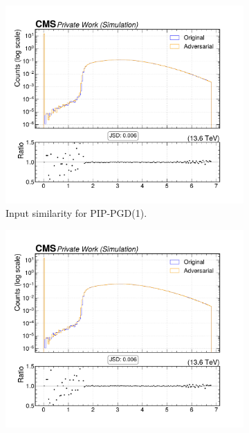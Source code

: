 \begin{figure}[htbp]
  \centering
  \begin{subfigure}[t]{0.32\textwidth}
    \includegraphics[width=\linewidth]{media/output/features/compare/combined_it_1/cmp_cpf_arr_Cpfcan_BtagPf_trackEtaRel.pdf}
    \caption*{Input similarity for PIP-PGD(1).}
  \end{subfigure}\hfill
  \begin{subfigure}[t]{0.32\textwidth}
    \includegraphics[width=\linewidth]{media/output/features/compare/combined_it_2/cmp_cpf_arr_Cpfcan_BtagPf_trackEtaRel.pdf}

\end{subfigure}
\end{figure}
